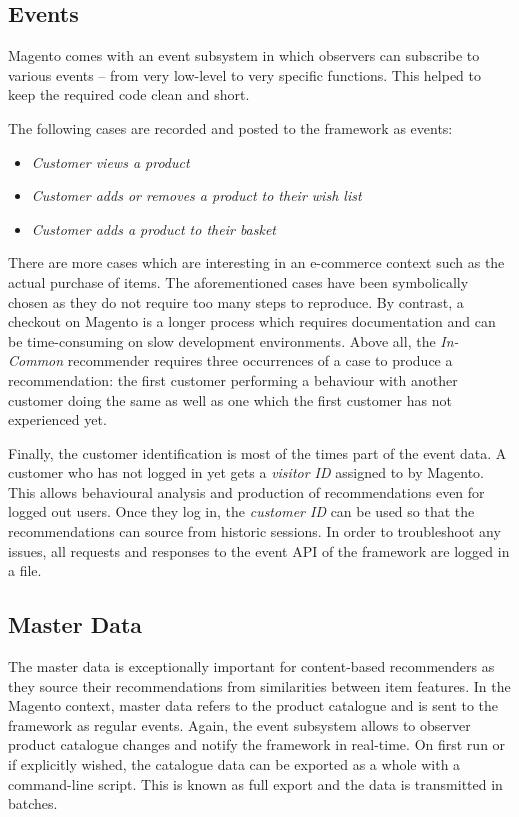 \subsection{Events}
\label{implementation-magento-events}

Magento comes with an event subsystem in which observers can subscribe to various events -- from very low-level to very specific functions. This helped to keep the required code clean and short.

The following cases are recorded and posted to the framework as events:

\begin{itemize}
\item \emph{Customer views a product}
\item \emph{Customer adds or removes a product to their wish list}
\item \emph{Customer adds a product to their basket}
\end{itemize}

There are more cases which are interesting in an e-commerce context such as the actual purchase of items. The aforementioned cases have been symbolically chosen as they do not require too many steps to reproduce. By contrast, a checkout on Magento is a longer process which requires documentation and can be time-consuming on slow development environments. Above all, the \emph{In-Common} recommender requires three occurrences of a case to produce a recommendation: the first customer performing a behaviour with another customer doing the same as well as one which the first customer has not experienced yet.

Finally, the customer identification is most of the times part of the event data. A customer who has not logged in yet gets a \emph{visitor ID} assigned to by Magento. This allows behavioural analysis and production of recommendations even for logged out users. Once they log in, the \emph{customer ID} can be used so that the recommendations can source from historic sessions. In order to troubleshoot any issues, all requests and responses to the event API of the framework are logged in a file.

\subsection{Master Data}

The master data is exceptionally important for content-based recommenders as they source their recommendations from similarities between item features. In the Magento context, master data refers to the product catalogue and is sent to the framework as regular events. Again, the event subsystem allows to observer product catalogue changes and notify the framework in real-time. On first run or if explicitly wished, the catalogue data can be exported as a whole with a command-line script. This is known as full export and the data is transmitted in batches.

